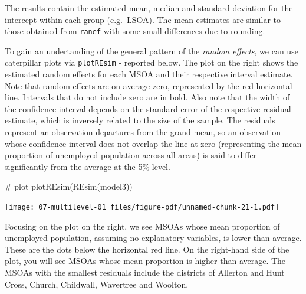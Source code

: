 \documentclass[
  letterpaper,
  DIV=11,
  numbers=noendperiod,
  oneside]{scrreprt}
\newenvironment{Shaded}{\begin{snugshade}}{\end{snugshade}}
\newcommand{\CommentTok}[1]{\textcolor[rgb]{0.37,0.37,0.37}{#1}}
\newcommand{\FunctionTok}[1]{\textcolor[rgb]{0.28,0.35,0.67}{#1}}
\newcommand{\NormalTok}[1]{\textcolor[rgb]{0.00,0.23,0.31}{#1}}
\begin{document}
The results contain the estimated mean, median and standard deviation
for the intercept within each group (e.g.~LSOA). The mean estimates are
similar to those obtained from \texttt{ranef} with some small
differences due to rounding.

To gain an undertanding of the general pattern of the \emph{random
effects}, we can use caterpillar plots via \texttt{plotREsim} - reported
below. The plot on the right shows the estimated random effects for each
MSOA and their respective interval estimate. Note that random effects
are on average zero, represented by the red horizontal line. Intervals
that do not include zero are in bold. Also note that the width of the
confidence interval depends on the standard error of the respective
residual estimate, which is inversely related to the size of the sample.
The residuals represent an observation departures from the grand mean,
so an observation whose confidence interval does not overlap the line at
zero (representing the mean proportion of unemployed population across
all areas) is said to differ significantly from the average at the 5\%
level.

\begin{Shaded}
\begin{Highlighting}[]
\CommentTok{\# plot}
\FunctionTok{plotREsim}\NormalTok{(}\FunctionTok{REsim}\NormalTok{(model3)) }
\end{Highlighting}
\end{Shaded}

\texttt{[image: 07-multilevel-01\_files/figure-pdf/unnamed-chunk-21-1.pdf]}

Focusing on the plot on the right, we see MSOAs whose mean proportion of
unemployed population, assuming no explanatory variables, is lower than
average. These are the dots below the horizontal red line. On the
right-hand side of the plot, you will see MSOAs whose mean proportion is
higher than average. The MSOAs with the smallest residuals include the
districts of Allerton and Hunt Cross, Church, Childwall, Wavertree and
Woolton.

\end{document}
